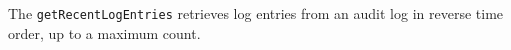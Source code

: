 The \verb+getRecentLogEntries+ retrieves log entries from an audit log in reverse time order, up to a maximum
count.
